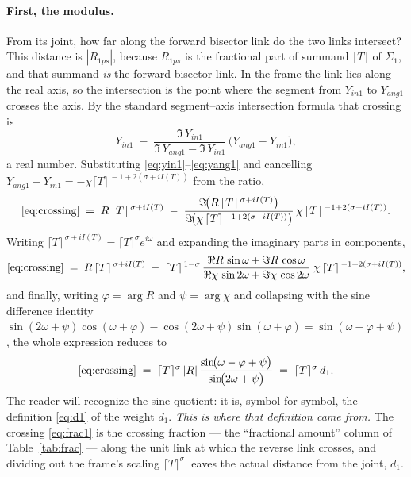 \documentclass[11pt]{article}
\theoremstyle{definition}
\begin{document}
\paragraph{First, the modulus.} From its joint, how far along the forward
bisector link do the two links intersect? This distance is $|R_{1ps}|$,
because $R_{1ps}$ is the fractional part of summand $\lceil T\rceil$ of
$\Sigma_1$, and that summand \emph{is} the forward bisector link. In the
frame the link lies along the real axis, so the intersection is the point
where the segment from $Y_{in1}$ to $Y_{ang1}$ crosses the axis. By the
standard segment--axis intersection formula that crossing is
\begin{equation}\label{eq:crossing}
Y_{in1}
\;-\;
\frac{\Im\,Y_{in1}}
     {\Im\,Y_{ang1}-\Im\,Y_{in1}}\,
\bigl(Y_{ang1}-Y_{in1}\bigr),
\end{equation}
a real number. Substituting \eqref{eq:yin1}--\eqref{eq:yang1} and cancelling
$Y_{ang1}-Y_{in1}=-\chi\lceil T\rceil^{\,-1+2(\sigma+iI(T))}$ from the ratio,
\begin{equation}\label{eq:yang3lin}
\eqref{eq:crossing}
\;=\;
R\,\lceil T\rceil^{\,\sigma+iI(T)}
\;-\;
\frac{\Im\!\bigl(R\,\lceil T\rceil^{\,\sigma+iI(T)}\bigr)}
     {\Im\!\bigl(\chi\,\lceil T\rceil^{\,-1+2(\sigma+iI(T))}\bigr)}\,
\chi\,\lceil T\rceil^{\,-1+2(\sigma+iI(T))}.
\end{equation}
Writing $\lceil T\rceil^{\,\sigma+iI(T)}=\lceil T\rceil^{\sigma}e^{i\omega}$
and expanding the imaginary parts in components,
\begin{equation}\label{eq:compact5}
\eqref{eq:crossing}
\;=\;
R\,\lceil T\rceil^{\,\sigma+iI(T)}
\;-\;
\lceil T\rceil^{\,1-\sigma}\,
\frac{\Re R\,\sin\omega+\Im R\,\cos\omega}
     {\Re\chi\,\sin 2\omega+\Im\chi\,\cos 2\omega}\;
\chi\,\lceil T\rceil^{\,-1+2(\sigma+iI(T))},
\end{equation}
and finally, writing $\varphi=\arg R$ and $\psi=\arg\chi$ and collapsing with
the sine difference identity
$\sin(2\omega+\psi)\cos(\omega+\varphi)-\cos(2\omega+\psi)\sin(\omega+\varphi)
=\sin(\omega-\varphi+\psi)$, the whole expression reduces to
\begin{equation}\label{eq:frac1}
\eqref{eq:crossing}
\;=\;
\lceil T\rceil^{\sigma}\,|R|\,
\frac{\sin\!\bigl(\omega-\varphi+\psi\bigr)}{\sin\!\bigl(2\omega+\psi\bigr)}
\;=\; \lceil T\rceil^{\sigma}\, d_1 .
\end{equation}
The reader will recognize the sine quotient: it is, symbol for symbol, the
definition \eqref{eq:d1} of the weight $d_1$. \emph{This is where that
definition came from.} The crossing \eqref{eq:frac1} is the crossing
fraction --- the ``fractional amount'' column of Table~\ref{tab:frac} ---
along the unit link at which the reverse link crosses, and dividing out the frame's
scaling $\lceil T\rceil^{\sigma}$ leaves the actual distance from the joint,
$d_1$.
\end{document}
